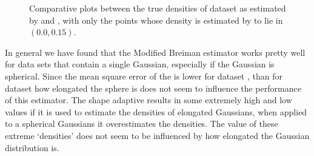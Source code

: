 \begin{figure}
\begin{subfigure}{0.6\columnwidth}
			\caption{\sambe}
			\label{fig:results:baakman5:noOUtliers:sambe}
		\end{subfigure}	
		\caption{Comparative plots between the true densities of dataset \baakmanFiveNum as estimated by  \mbe and  \sambe, with only the points whose density is estimated by \sambe to lie in $\left(\num{0.0}, \num{0.15} \right)$.}
		\label{fig:results:baakman5:noOutliers}
	\end{figure}

	In general we have found that the Modified Breiman estimator works pretty well for data sets that contain a single Gaussian, especially if the Gaussian is spherical. Since the mean square error of the \mbe is lower for dataset \baakmanFive, than for dataset \baakmanFour how elongated the sphere is does not seem to influence the performance of this estimator. 
	The shape adaptive \mbe results in some extremely high and low values if it is used to estimate the densities of elongated Gaussians, when applied to a spherical Gaussians it overestimates the densities. The value of these extreme `densities' does not seem to be influenced by how elongated the Gaussian distribution is. 
